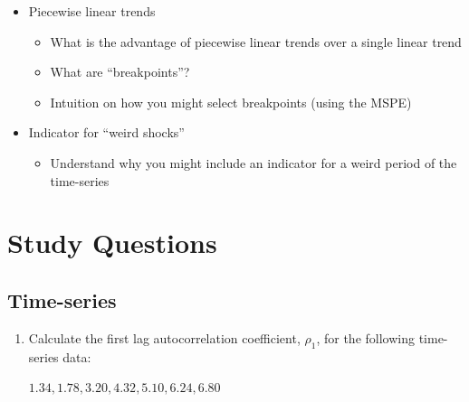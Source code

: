\documentclass[12pt]{article}
\begin{document}
\begin{enumerate}
\begin{itemize}
    \item Piecewise linear trends
    \begin{itemize}
      \item What is the advantage of piecewise linear trends over a single linear trend
      
      \item What are ``breakpoints''?
      
      \item Intuition on how you might select breakpoints (using the MSPE)
    \end{itemize}

    \item Indicator for ``weird shocks''
    \begin{itemize}
      \item Understand why you might include an indicator for a weird period of the time-series
    \end{itemize}
  \end{itemize}
\end{enumerate}



\newpage
\section*{Study Questions}

\subsection*{Time-series}
\begin{enumerate}
  \item Calculate the first lag autocorrelation coefficient, $\rho_1$, for the following time-series data: 
  
  $1.34, 1.78, 3.20, 4.32, 5.10, 6.24, 6.80$
\end{enumerate}
\end{document}

